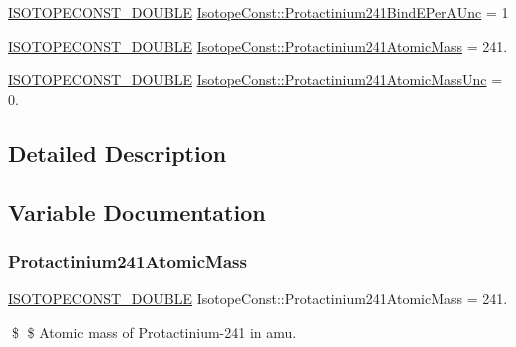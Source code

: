 \begin{DoxyCompactItemize}
\item 
\mbox{\hyperlink{group___isotope_const-_macros_ga8f45a7272ce02c0b4c65c44636ed719a}{I\+S\+O\+T\+O\+P\+E\+C\+O\+N\+S\+T\+\_\+\+D\+O\+U\+B\+LE}} \mbox{\hyperlink{group___isotope_const-_protactinium-_pa241_gadb42a8323f5452599d05926da706da08}{Isotope\+Const\+::\+Protactinium241\+Bind\+E\+Per\+A\+Unc}} = 1
\item 
\mbox{\hyperlink{group___isotope_const-_macros_ga8f45a7272ce02c0b4c65c44636ed719a}{I\+S\+O\+T\+O\+P\+E\+C\+O\+N\+S\+T\+\_\+\+D\+O\+U\+B\+LE}} \mbox{\hyperlink{group___isotope_const-_protactinium-_pa241_gaeda5fa4e8f0541b508de4f91b878f023}{Isotope\+Const\+::\+Protactinium241\+Atomic\+Mass}} = 241.
\item 
\mbox{\hyperlink{group___isotope_const-_macros_ga8f45a7272ce02c0b4c65c44636ed719a}{I\+S\+O\+T\+O\+P\+E\+C\+O\+N\+S\+T\+\_\+\+D\+O\+U\+B\+LE}} \mbox{\hyperlink{group___isotope_const-_protactinium-_pa241_ga4cf484d14b1232f184631ed632cf21ca}{Isotope\+Const\+::\+Protactinium241\+Atomic\+Mass\+Unc}} = 0.
\end{DoxyCompactItemize}


\subsection{Detailed Description}


\subsection{Variable Documentation}
\mbox{\label{group___isotope_const-_protactinium-_pa241_gaeda5fa4e8f0541b508de4f91b878f023}} 
\subsubsection{\texorpdfstring{Protactinium241\+Atomic\+Mass}{Protactinium241AtomicMass}}
{\footnotesize\ttfamily \mbox{\hyperlink{group___isotope_const-_macros_ga8f45a7272ce02c0b4c65c44636ed719a}{I\+S\+O\+T\+O\+P\+E\+C\+O\+N\+S\+T\+\_\+\+D\+O\+U\+B\+LE}} Isotope\+Const\+::\+Protactinium241\+Atomic\+Mass = 241.}

\$ \$ Atomic mass of Protactinium-\/241 in amu. \mbox{\label{group___isotope_const-_protactinium-_pa241_ga4cf484d14b1232f184631ed632cf21ca}} 
